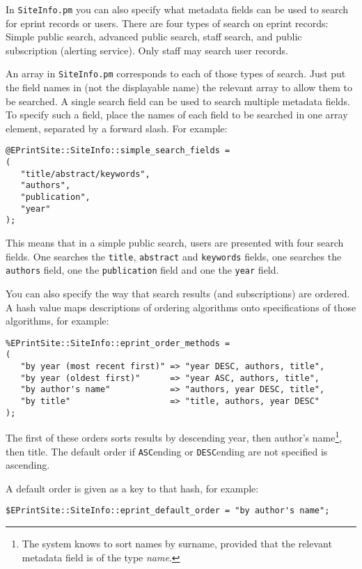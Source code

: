In {\tt SiteInfo.pm} you can also specify what metadata fields can be used to search for eprint records or users. There are four types of search on eprint records: Simple public search, advanced public search, staff search, and public subscription (alerting service). Only staff may search user records.

An array in {\tt SiteInfo.pm} corresponds to each of those types of search. Just put the field names in (not the displayable name) the relevant array to allow them to be searched. A single search field can be used to search multiple metadata fields. To specify such a field, place the names of each field to be searched in one array element, separated by a forward slash. For example:

\begin{verbatim}
@EPrintSite::SiteInfo::simple_search_fields =
(
   "title/abstract/keywords",
   "authors",
   "publication",
   "year"
);
\end{verbatim}

This means that in a simple public search, users are presented with four search fields. One searches the {\tt title}, {\tt abstract} and {\tt keywords} fields, one searches the {\tt authors} field, one the {\tt publication} field and one the {\tt year} field.

You can also specify the way that search results (and subscriptions) are ordered. A hash value maps descriptions of ordering algorithms onto specifications of those algorithms, for example:

\begin{verbatim}
%EPrintSite::SiteInfo::eprint_order_methods =
(
   "by year (most recent first)" => "year DESC, authors, title",
   "by year (oldest first)"      => "year ASC, authors, title",
   "by author's name"            => "authors, year DESC, title",
   "by title"                    => "title, authors, year DESC"
);
\end{verbatim}

The first of these orders sorts results by descending year, then author's name\footnote{The system knows to sort names by surname, provided that the relevant metadata field is of the type \emph{name}.}, then title. The default order if {\tt ASC}ending or {\tt DESC}ending are not specified is ascending.

A default order is given as a key to that hash, for example:

\begin{verbatim}
$EPrintSite::SiteInfo::eprint_default_order = "by author's name";
\end{verbatim}

